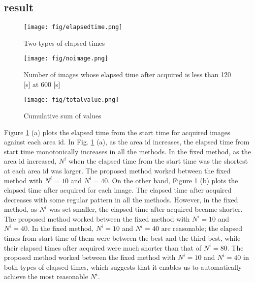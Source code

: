 \documentclass{ieeeaccess}
\begin{document}
\subsection{result}

\begin{figure}[t]
\begin{center}
\texttt{[image: fig/elapsedtime.png]}
\caption{Two types of elapsed times}
\label{elapsed}
\end{center}
\end{figure}

\begin{figure*}[t]
\begin{center}
\texttt{[image: fig/noimage.png]}
\caption{Number of images whose elapsed time after acquired is less than 120 [s]  at 600 [s]}
\label{totalnumber}
\end{center}
\end{figure*}

\begin{figure*}[t]
\begin{center}
\texttt{[image: fig/totalvalue.png]}
\caption{Cumulative sum of values}
\label{totalvalue}
\end{center}
\end{figure*}

Figure \ref{elapsed} (a) plots the elapsed time from the start time for acquired images against each area id.
In Fig. \ref{elapsed} (a), as the area id increases, the elapsed time from start time monotonically increases in all the methods.
In the fixed method, as the area id increased, $N^i$ when the elapsed time from the start time was the shortest at each area id was larger.
The proposed method worked between the fixed method with $N^i=10$ and $N^i=40$.
%
On the other hand, Figure \ref{elapsed} (b) plots the elapsed time after acquired for each image.
The elapsed time after acquired decreases with some regular pattern in all the methods.
However, in the fixed method, as $N^i$ was set smaller, the elapsed time after acquired became shorter.
The proposed method worked between the fixed method with $N^i=10$ and $N^i=40$.
%
In the fixed method, $N^i=10$ and $N^i=40$ are reasonable; the elapsed times from start time of them were between the best and the third best, while their elapsed times after acquired were much shorter than that of $N^i=80$.
%
The proposed method worked between the fixed method with $N^i=10$ and $N^i=40$ in both types of elapsed times, which suggests that it enables us to automatically achieve the most reasonable $N^i$.
\end{document}
